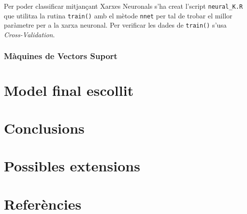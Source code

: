 \documentclass[a4paper]{article}
\begin{document}
Per poder classificar mitjançant Xarxes Neuronals s'ha creat l'script \verb|neural_K.R| que utilitza la rutina \verb|train()| amb el mètode \verb|nnet| per tal de trobar el millor paràmetre per a la xarxa neuronal. Per verificar les dades de \verb|train()| s'usa \emph{Cross-Validation}.

\subsubsection{Màquines de Vectors Suport}

\section{Model final escollit}
\section{Conclusions}
\section{Possibles extensions}
\section{Referències}



\end{document}
